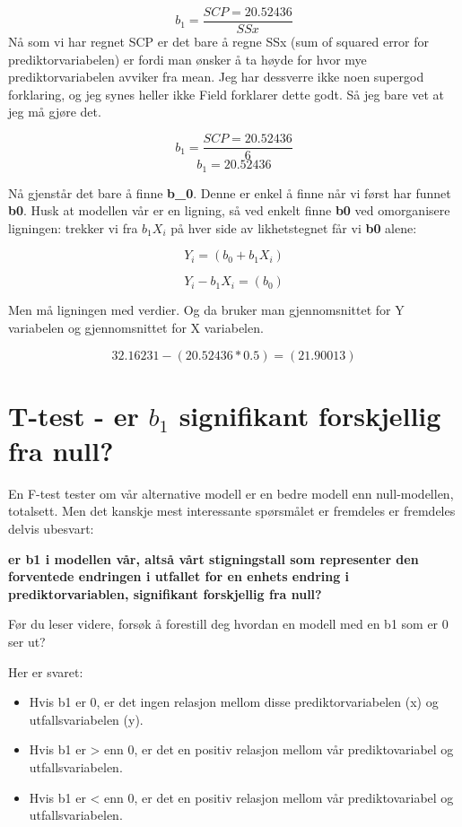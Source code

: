 \documentclass[
]{book}
\providecommand{\tightlist}{%
  \setlength{\itemsep}{0pt}\setlength{\parskip}{0pt}}
\begin{document}
\[ b_1 = \frac{SCP = 20.52436}{SSx} \]
Nå som vi har regnet SCP er det bare å regne SSx (sum of squared error for prediktorvariabelen) er fordi man ønsker å ta høyde for hvor mye prediktorvariabelen avviker fra mean. Jeg har dessverre ikke noen supergod forklaring, og jeg synes heller ikke Field forklarer dette godt. Så jeg bare vet at jeg må gjøre det.

\[ b_1 = \frac{SCP = 20.52436}{6} \]
\[ b_1 = 20.52436 \]

Nå gjenstår det bare å finne \textbf{b\_0}. Denne er enkel å finne når vi først har funnet \textbf{b0}. Husk at modellen vår er en ligning, så ved enkelt finne \textbf{b0} ved omorganisere ligningen: trekker vi fra \(b_1X_i\) på hver side av likhetstegnet får vi \textbf{b0} alene:

\[
Y_i = (b_0 + b_1X_i)
\]

\[
Y_i - b_1X_i = (b_0)
\]

Men må ligningen med verdier. Og da bruker man gjennomsnittet for Y variabelen og gjennomsnittet for X variabelen.

\[
32.16231     - (20.52436*0.5) = (21.90013)
\]

\hypertarget{t-test---er-b_1-signifikant-forskjellig-fra-null}{%
\chapter{\texorpdfstring{T-test - er \(b_1\) signifikant forskjellig fra null?}{T-test - er b\_1 signifikant forskjellig fra null?}}\label{t-test---er-b_1-signifikant-forskjellig-fra-null}}

En F-test tester om vår alternative modell er en bedre modell enn null-modellen, totalsett. Men det kanskje mest interessante spørsmålet er fremdeles er fremdeles delvis ubesvart:

\textbf{er b1 i modellen vår, altså vårt stigningstall som representer den forventede endringen i utfallet for en enhets endring i prediktorvariablen, signifikant forskjellig fra null?}

Før du leser videre, forsøk å forestill deg hvordan en modell med en b1 som er 0 ser ut?

Her er svaret:

\begin{itemize}
\tightlist
\item
  Hvis b1 er 0, er det ingen relasjon mellom disse prediktorvariabelen (x) og utfallsvariabelen (y).
\item
  Hvis b1 er \textgreater{} enn 0, er det en positiv relasjon mellom vår prediktovariabel og utfallsvariabelen.
\item
  Hvis b1 er \textless{} enn 0, er det en positiv relasjon mellom vår prediktovariabel og utfallsvariabelen.
\end{itemize}
\end{document}

